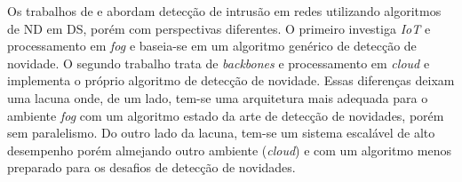 


Os trabalhos de  e  abordam
detecção de intrusão em redes utilizando algoritmos de ND em DS, porém com
perspectivas diferentes.
O primeiro investiga \emph{IoT} e processamento em \emph{fog} e baseia-se em um
algoritmo genérico de detecção de novidade.
O segundo trabalho trata de \emph{backbones} e processamento em \emph{cloud} e
implementa o próprio algoritmo de detecção de novidade.
Essas diferenças deixam uma lacuna onde, de um lado, tem-se uma
arquitetura mais adequada para o ambiente \emph{fog} com um algoritmo estado da arte de
detecção de novidades, porém sem paralelismo.
Do outro lado da lacuna, tem-se um sistema
escalável de alto desempenho porém almejando outro ambiente (\emph{cloud}) e
com um algoritmo menos preparado para os desafios de detecção de 
novidades.
% 

